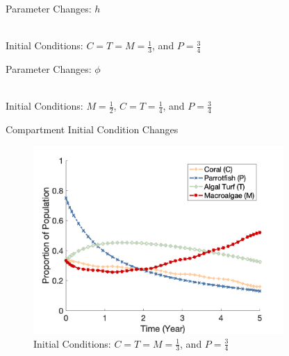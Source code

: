 \documentclass{beamer}
\begin{document}
\begin{frame}{Parameter Changes: $h$}
    \begin{center}
        \\
        Initial Conditions: $C = T = M = \frac{1}{3}$, and $P = \frac{3}{4}$
    \end{center}
\end{frame}


\begin{frame}{Parameter Changes: $\phi$}
    \begin{center}
        \\
        Initial Conditions: $M = \frac{1}{2}$, $C = T = \frac{1}{4}$, and $P = \frac{3}{4}$
    \end{center}
\end{frame}

\begin{frame}{Compartment Initial Condition Changes}
    \begin{figure}
        \centering
        \includegraphics[width=0.85\textwidth]{Latex/Figures/Graphs/0.3C_0.3T_0.3M.png}
        \caption{Initial Conditions: $C = T = M = \frac{1}{3}$, and $P = \frac{3}{4}$}
        \label{fig:initial_plot}
    \end{figure}
\end{frame}
\end{document}
